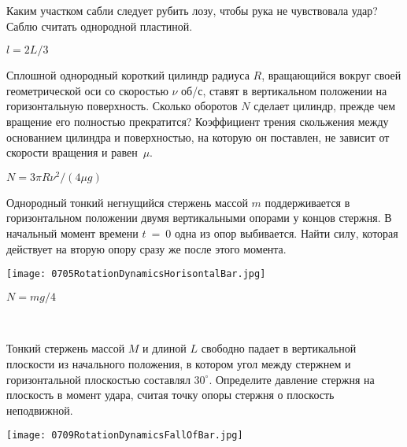 \begin{ex}
Каким участком сабли следует рубить лозу, чтобы рука не чувствовала удар? Саблю считать однородной пластиной.
\begin{ans}
$l=2L/3$
\end{ans}
\end{ex}

\begin{ex}
Сплошной однородный короткий цилиндр радиуса $R$, вращающийся вокруг своей геометрической оси со скоростью $\nu$ об/с, ставят в вертикальном положении на горизонтальную поверхность. Сколько оборотов $N$ сделает цилиндр, прежде чем вращение его полностью прекратится? Коэффициент трения скольжения между основанием цилиндра и поверхностью, на которую он поставлен, не зависит от скорости вращения и равен~$\mu$.
\begin{ans}
$N=3 \pi R \nu^2/(4\mu g)$
\end{ans}
\end{ex}

\begin{ex}
Однородный тонкий негнущийся стержень массой $m$ поддерживается в горизонтальном положении двумя вертикальными опорами у концов стержня. В начальный момент времени $t~=~0$ одна из опор выбивается. Найти силу, которая действует на вторую опору сразу же после этого момента.
\begin{center}
\texttt{[image: 0705RotationDynamicsHorisontalBar.jpg]}
\end{center}
\begin{ans}
$N = mg/4$
\end{ans}
\end{ex}

\begin{ex}
\hspace{0pt} \\
\begin{minipage}{.65\textwidth}
Тонкий стержень массой $M$ и длиной $L$ свободно падает в вертикальной плоскости из начального положения, в котором угол между стержнем и горизонтальной плоскостью составлял $30^{\circ}$. Определите давление стержня на плоскость в момент удара, считая точку опоры стержня о плоскость неподвижной.
\end{minipage}
\begin{minipage}{.35\textwidth}
\centering
\texttt{[image: 0709RotationDynamicsFallOfBar.jpg]}
\end{minipage}
\begin{ans}

\end{ans}
\end{ex}

